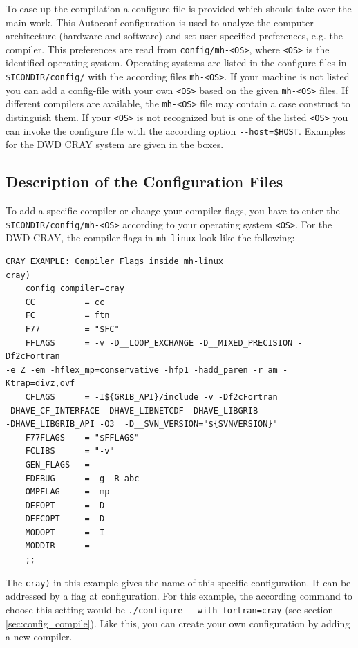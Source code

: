 
To ease up the compilation a configure-file is provided which should take over the main work. This Autoconf configuration is used to analyze the computer architecture (hardware and software) and set user specified preferences, e.g. the compiler. This preferences are read from \verb+config/mh-<OS>+, where \verb+<OS>+ is the identified operating system. Operating systems are listed in the configure-files in \verb+$ICONDIR/config/+ with the according files \verb+mh-<OS>+. If your machine is not listed you can add a config-file with your own \verb+<OS>+ based on the given \verb+mh-<OS>+ files. If different compilers are available, the \verb+mh-<OS>+ file may contain a case construct to distinguish them. If your \verb+<OS>+ is not recognized but is one of the listed \verb+<OS>+ you can invoke the configure file with the according option \verb+--host=$HOST+. Examples for the DWD CRAY system are given in the boxes.

\subsection{Description of the Configuration Files}

To add a specific compiler or change your compiler flags, you have to enter the \newline \verb+$ICONDIR/config/mh-<OS>+ according to your operating system \verb+<OS>+. For the DWD CRAY, the compiler flags in \verb+mh-linux+ look like the following:

\begin{Verbatim}[frame=single]
CRAY EXAMPLE: Compiler Flags inside mh-linux
cray)
    config_compiler=cray
	CC          = cc
    FC          = ftn
    F77         = "$FC"
    FFLAGS      = -v -D__LOOP_EXCHANGE -D__MIXED_PRECISION -Df2cFortran 
-e Z -em -hflex_mp=conservative -hfp1 -hadd_paren -r am -Ktrap=divz,ovf
    CFLAGS      = -I${GRIB_API}/include -v -Df2cFortran 
-DHAVE_CF_INTERFACE -DHAVE_LIBNETCDF -DHAVE_LIBGRIB 
-DHAVE_LIBGRIB_API -O3  -D__SVN_VERSION="${SVNVERSION}"
    F77FLAGS    = "$FFLAGS"
    FCLIBS      = "-v"
    GEN_FLAGS   =
    FDEBUG      = -g -R abc
    OMPFLAG     = -mp
    DEFOPT      = -D
    DEFCOPT     = -D
    MODOPT      = -I
    MODDIR      = 
    ;;
\end{Verbatim}

The \verb+cray)+ in this example gives the name of this specific configuration. It can be addressed by a flag at configuration. For this example, the according command to choose this setting would be \verb+./configure --with-fortran=cray+ (see section \ref{sec:config_compile}). Like this, you can create your own configuration by adding a new compiler.

